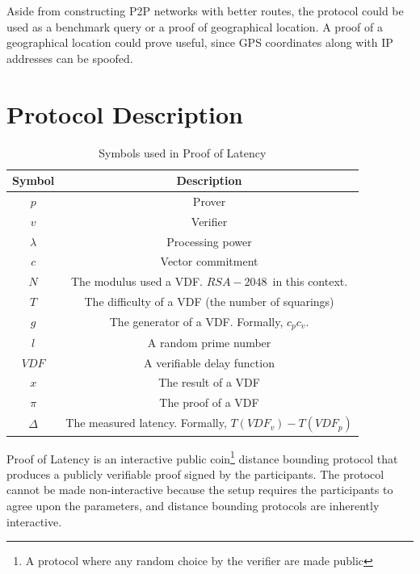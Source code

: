 Aside from constructing P2P networks with better routes, the protocol could be used as a benchmark query or a proof of geographical location. A proof of a geographical location could prove useful, since GPS coordinates along with IP addresses can be spoofed.

\section{Protocol Description}
\begin{table}[h!]
	\centering
	\begin{tabular}{ c|c  }
		Symbol        & Description                                             \\
		\hline
		\( p \)       & Prover                                                  \\
		\( v \)       & Verifier                                                \\
		\( \lambda \) & Processing power                                        \\
		\( c \)       & Vector commitment                                       \\
		\( N \)       & The modulus used a VDF. \(RSA-2048\)~in this context.   \\

		\( T \)       & The difficulty of a VDF (the number of squarings)       \\
		\( g \)       & The generator of a VDF. Formally, \(c_p c_v\).          \\
		\( l \)       & A random prime number                                   \\
		\( VDF \)     & A verifiable delay function                             \\
		\( x \)       & The result of a VDF                                     \\
		\(\pi \)      & The proof of a VDF                                      \\
		\(\Delta\)    & The measured latency. Formally, \(T(VDF_v) - T(VDF_p)\) \\
	\end{tabular}
	\caption{Symbols used in Proof of Latency}
	\label{table:1}
\end{table}

Proof of Latency is an interactive public coin\footnote{A protocol where any random choice by the verifier are made public} distance bounding protocol that produces a publicly verifiable proof signed by the participants. The protocol cannot be made non-interactive because the setup requires the participants to agree upon the parameters, and distance bounding protocols are inherently interactive.

